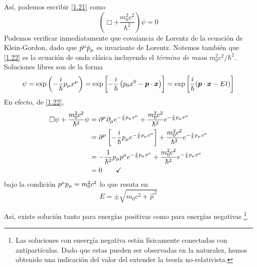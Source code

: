 Así, podemos escribir \eqref{1.21} como
\begin{equation}\label{1.22}
  \left(\Box+\frac{m_0^2c^2}{\hbar^2}\right)\psi=0
\end{equation}
Podemos verificar inmediatamente que covaiancia de Lorentz de la ecuación de Klein-Gordon, dado que $ \hat{p}^\mu \hat{p}_\mu$ es invariante de Lorentz. Notemos también que \eqref{1.22} es la ecuación de onda clásica incluyendo el \textit{término de masa} $m_0^2c^2/\hbar^2$. Soluciones libres son de la forma
\begin{equation}\label{1.23}
  \psi=\exp\left(-\frac{i}{\hbar} p_\mu x^\mu \right)=\exp\left[-\frac{i}{\hbar}\left(p_0x^0-\vb*{p}\cdot\vb*{x}\right)\right]=\exp\left[\frac{i}{\hbar}(\vb*{p}\cdot\vb*{x}-Et)\right]
\end{equation}
En efecto, de \eqref{1.22},
\begin{align}
  \Box\psi+\frac{m_0^2c^2}{\hbar^2}\psi&=\partial^\mu\partial_\mu e^{-\frac{i}{\hbar}p_\mu x^\mu }+\frac{m_0^2c^2}{\hbar^2}e^{-\frac{i}{\hbar}p_\mu x^\mu }\\
  &=\partial^\mu \left[-\frac{i}{\hbar}p_\mu e^{-\frac{i}{\hbar}p_\mu x^\mu }\right]+\frac{m_0^2c^2}{\hbar^2}e^{-\frac{i}{\hbar}p_\mu x^\mu }\\
  &=-\frac{1}{\hbar^2}p_\mu p^\mu e^{-\frac{i}{\hbar}p_\mu x^\mu }+\frac{m_0^2c^2}{\hbar^2}e^{-\frac{i}{\hbar}p_\mu x^\mu }\\
  &=0\qquad \checkmark
\end{align}
bajo la condición $p^\mu p_\mu =m_0^2c^2$ lo que resuta en
\begin{equation}\label{1.24}
  E=\pm \sqrt{m_0c^2+\vec{p}^2}
\end{equation}



Así, existe solución tanto para energías positivas como para energías negativas \footnote{Las soluciones con eneergía negativa están físicamente conectadas con antipartículas. Dado que estas pueden ser observadas en la naturalez, hemos obtenido una indicación del valor del extender la teoría no-relativista.}.

